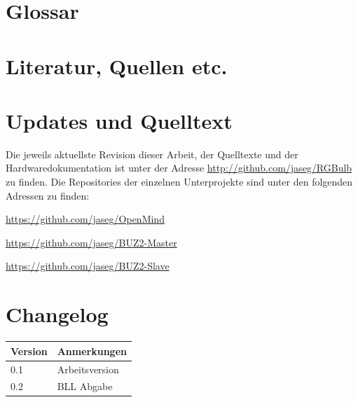\documentclass[12pt,a4paper,notitlepage]{article}
\begin{document}
\appendix
\section{Glossar}
\glsaddall
\printglossary[type=\acronymtype,title={Abkürzungen}]
\printglossary[title={Begriffserklärungen}]
\section{Literatur, Quellen etc.}
\nocite{STELTZ1}
\nocite{TEXAS2,TEXAS3,TEXAS4,TEXAS5,TEXAS6,TEXAS7,TEXAS8,TEXAS9}
\nocite{MAXIM46,MAXIM48}
\nocite{MAXIM75,MAXIM73,MAXIM72,MAXIM71,MAXIM69,MAXIM68,MAXIM67,MAXIM66,MAXIM65,MAXIM62,MAXIM57,MAXIM54,MAXIM53,MAXIM51,MAXIM47}
\nocite{MAXIM50}

\renewcommand{\refname}{}

\section{Updates und Quelltext}
\begin{center}

\begin{minipage}{11cm}
\begin{center}
\sffamily%
\vspace{2mm}
Die jeweils aktuellste Revision dieser Arbeit, der Quelltexte und der Hardwaredokumentation ist unter der Adresse 
\url{http://github.com/jaseg/RGBulb} zu finden. Die Repositories der einzelnen Unterprojekte sind unter den folgenden Adressen zu finden:
\begin{description}
\item \url{https://github.com/jaseg/OpenMind}
\item \url{https://github.com/jaseg/BUZ2-Master}
\item \url{https://github.com/jaseg/BUZ2-Slave}
\end{description}
\vspace{2mm}
\end{center}
\end{minipage}
\end{center}
\section{Changelog}
\begin{tabularx}{\textwidth}{l|l}
\textbf{Version}&\textbf{Anmerkungen}\\\hline
0.1&Arbeitsversion\\
0.2&BLL Abgabe
\end{tabularx}
\end{document}
